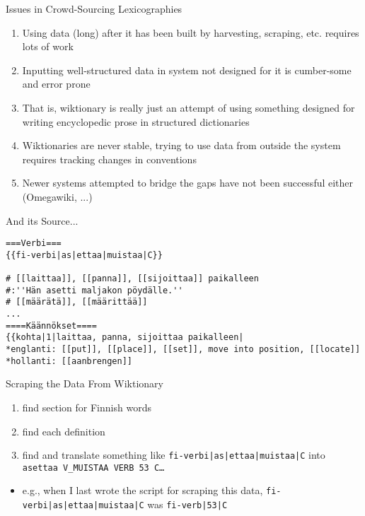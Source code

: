 \documentclass{beamer}
\begin{document}
\begin{frame}{Issues in Crowd-Sourcing Lexicographies}
    \begin{enumerate}
        \item Using data (long) after it has been built by harvesting, scraping,
            etc. requires lots of work
        \item Inputting well-structured data in system not designed for it is
            cumber-some and error prone
        \item That is, wiktionary is really just an attempt of using something
            designed for writing encyclopedic prose in structured dictionaries
        \item Wiktionaries are never stable, trying to use data from outside
            the system requires tracking changes in conventions
        \item Newer systems attempted to bridge the gaps have not been 
            successful either (Omegawiki, ...)
    \end{enumerate}
\end{frame}


\begin{frame}[fragile]{And its Source...}
    \begin{verbatim}
===Verbi===
{{fi-verbi|as|ettaa|muistaa|C}}

# [[laittaa]], [[panna]], [[sijoittaa]] paikalleen
#:''Hän asetti maljakon pöydälle.''
# [[määrätä]], [[määrittää]]
...
====Käännökset====
{{kohta|1|laittaa, panna, sijoittaa paikalleen|
*englanti: [[put]], [[place]], [[set]], move into position, [[locate]]
*hollanti: [[aanbrengen]]
\end{verbatim}
\end{frame}

\begin{frame}{Scraping the Data From Wiktionary}
    \begin{enumerate}
        \item find section for Finnish words
        \item find each definition
        \item find and translate something like
            \texttt{fi-verbi|as|ettaa|muistaa|C}
                into \texttt{asettaa V\_MUISTAA VERB 53 C\ldots}
    \end{enumerate}
    \begin{itemize}
        \item e.g., when I last wrote the script for scraping this data,
            \texttt{fi-verbi|as|ettaa|muistaa|C} was \texttt{fi-verb|53|C}
    \end{itemize}
\end{frame}
\end{document}
